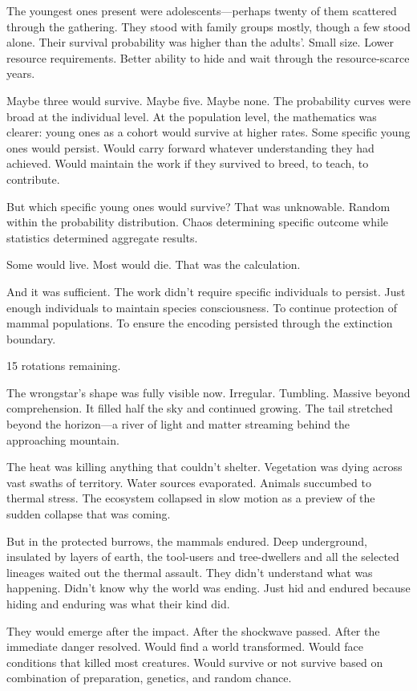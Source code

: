 The youngest ones present were adolescents—perhaps twenty of them scattered through the gathering. They stood with family groups mostly, though a few stood alone. Their survival probability was higher than the adults'. Small size. Lower resource requirements. Better ability to hide and wait through the resource-scarce years.

Maybe three would survive. Maybe five. Maybe none. The probability curves were broad at the individual level. At the population level, the mathematics was clearer: young ones as a cohort would survive at higher rates. Some specific young ones would persist. Would carry forward whatever understanding they had achieved. Would maintain the work if they survived to breed, to teach, to contribute.

But which specific young ones would survive? That was unknowable. Random within the probability distribution. Chaos determining specific outcome while statistics determined aggregate results.

Some would live. Most would die. That was the calculation.

And it was sufficient. The work didn't require specific individuals to persist. Just enough individuals to maintain species consciousness. To continue protection of mammal populations. To ensure the encoding persisted through the extinction boundary.

\scenebreak

15 rotations remaining.

The wrongstar's shape was fully visible now. Irregular. Tumbling. Massive beyond comprehension. It filled half the sky and continued growing. The tail stretched beyond the horizon—a river of light and matter streaming behind the approaching mountain.

The heat was killing anything that couldn't shelter. Vegetation was dying across vast swaths of territory. Water sources evaporated. Animals succumbed to thermal stress. The ecosystem collapsed in slow motion as a preview of the sudden collapse that was coming.

But in the protected burrows, the mammals endured. Deep underground, insulated by layers of earth, the tool-users and tree-dwellers and all the selected lineages waited out the thermal assault. They didn't understand what was happening. Didn't know why the world was ending. Just hid and endured because hiding and enduring was what their kind did.

They would emerge after the impact. After the shockwave passed. After the immediate danger resolved. Would find a world transformed. Would face conditions that killed most creatures. Would survive or not survive based on combination of preparation, genetics, and random chance.

